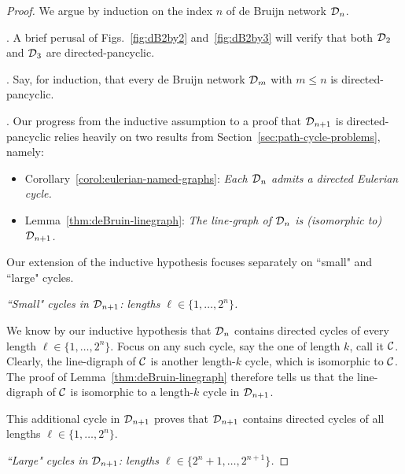 \begin{proof}
We argue by induction on the index $n$ of de Bruijn network $\mbox{$\cal D$}_n$.

\medskip

.  
 A brief perusal of Figs.~\ref{fig:dB2by2} and~\ref{fig:dB2by3} will verify that both $\mbox{$\cal D$}_2$ and $\mbox{$\cal D$}_3$ are directed-pancyclic.

\medskip

.
Say, for induction, that every de Bruijn network $\mbox{$\cal D$}_m$ with $m \leq n$ is directed-pancyclic.

\smallskip

.
Our progress from the inductive assumption to a proof that $\mbox{$\cal D$}_{n+1}$ is directed-pancyclic relies heavily on two results from Section~\ref{sec:path-cycle-problems}, namely:
\begin{itemize}
\item
Corollary~\ref{corol:eulerian-named-graphs}: {\em Each $\mbox{$\cal D$}_n$ admits a directed Eulerian cycle.}
\medskip\item
Lemma~\ref{thm:deBruin-linegraph}: {\em The line-graph of $\mbox{$\cal D$}_n$ is (isomorphic to) $\mbox{$\cal D$}_{n+1}$.}
\end{itemize}

\smallskip

Our extension of the inductive hypothesis focuses separately on ``small"  and ``large" cycles.

\medskip

  {\em ``Small" cycles in $\mbox{$\cal D$}_{n+1}$: lengths $\ell \in \{1, \ldots, 2^n\}$.}

\smallskip

\noindent
We know by our inductive hypothesis that $\mbox{$\cal D$}_n$ contains directed cycles of every length
$\ell \in \{1, \ldots, 2^n\}$.  Focus on any such cycle, say the one of length $k$, call it $\mbox{$\cal C$}$.  Clearly, the line-digraph of $\mbox{$\cal C$}$ is another length-$k$ cycle, which is isomorphic to $\mbox{$\cal C$}$.  The proof of Lemma~\ref{thm:deBruin-linegraph} therefore tells us that the line-digraph of $\mbox{$\cal C$}$ is
isomorphic to a length-$k$ cycle in $\mbox{$\cal D$}_{n+1}$.

\smallskip

This additional cycle in $\mbox{$\cal D$}_{n+1}$ proves that $\mbox{$\cal D$}_{n+1}$ contains directed cycles of all lengths $\ell \in \{1, \ldots, 2^n\}$.

\medskip

 {\em ``Large" cycles in $\mbox{$\cal D$}_{n+1}$: lengths $\ell \in \{2^n+ 1, \ldots, 2^{n+1}\}$.}


\end{proof}
